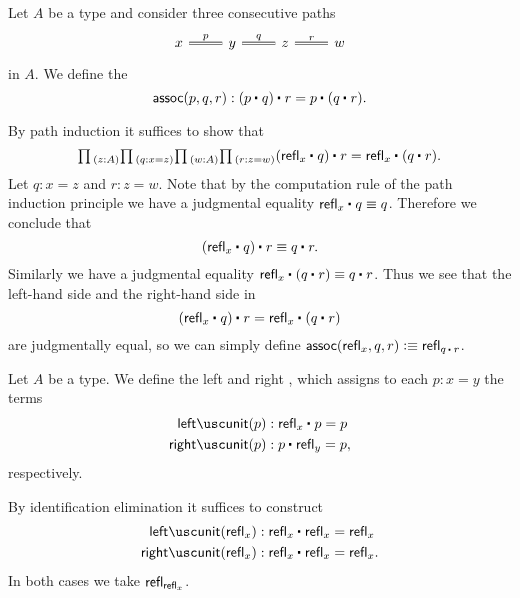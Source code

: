 \begin{defn}\label{defn:id_assoc}
  Let $A$ be a type and consider three consecutive paths
  \begin{equation*}
    \begin{tikzcd}
      x \arrow[r,equals,"p"] & y \arrow[r,equals,"q"] & z \arrow[r,equals,"r"] & w
    \end{tikzcd}
  \end{equation*}
  in $A$. We define the 
  \begin{equation*}
    \assoc(p,q,r) : \ct{(\ct{p}{q})}{r}=\ct{p}{(\ct{q}{r})}.
  \end{equation*}
\end{defn}

\begin{constr}
By path induction it suffices to show that
\begin{equation*}
\prd{z:A}{q:x=z}{w:A}{r:z=w} \ct{(\ct{\refl{x}}{q})}{r}= \ct{\refl{x}}{(\ct{q}{r})}.
\end{equation*}
Let $q:x=z$ and $r:z=w$. Note that by the computation rule of the path induction principle we have a judgmental equality $\ct{\refl{x}}{q}\jdeq q$. Therefore we conclude that
\begin{equation*}
  \ct{(\ct{\refl{x}}{q})}{r}\jdeq \ct{q}{r}.
\end{equation*}
Similarly we have a judgmental equality $\ct{\refl{x}}{(\ct{q}{r})}\jdeq \ct{q}{r}$. Thus we see that the left-hand side and the right-hand side in
\begin{equation*}
  \ct{(\ct{\refl{x}}{q})}{r}=\ct{\refl{x}}{(\ct{q}{r})}
\end{equation*}
are judgmentally equal, so we can simply define $\assoc(\refl{x},q,r)\defeq\refl{\ct{q}{r}}$.
\end{constr}

\begin{defn}\label{defn:id_unit}
Let $A$ be a type. We define the left and right , which assigns to each $p:x=y$ the terms
\begin{align*}
\leftunit(p) & : \ct{\refl{x}}{p}=p \\
\rightunit(p) & : \ct{p}{\refl{y}}=p,
\end{align*}
respectively.
\end{defn}

\begin{constr}
By identification elimination it suffices to construct
\begin{align*}
\leftunit(\refl{x}) & : \ct{\refl{x}}{\refl{x}} = \refl{x} \\
\rightunit(\refl{x}) & : \ct{\refl{x}}{\refl{x}} = \refl{x}.
\end{align*}
In both cases we take $\mathsf{refl}_{\mathsf{refl}_{x}}$.
\end{constr}

